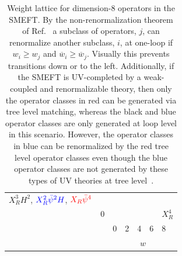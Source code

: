 \begin{table}[H]
\begin{center}
\begin{tabular}[t]{c c *5{| p{2.35cm}} }
$X_R^3 H^2$, ${\color{blue} X_R^2 \bar \psi^2 H}$, ${\color{red} X_R \bar \psi^4}$ \\ 
& 0 &      
           &                           
           &                         
           &                           
           & 
$X_R^4$ \\ 
& & 0 & 2 & 4 & 6 & 8 \\
 & 
\end{tabular}
\end{center}
\caption{Weight lattice for dimension-8 operators in the SMEFT. 
By the non-renormalization theorem of Ref.~\cite{Cheung:2015aba} a subclass of operators, $j$, can renormalize another subclass, $i$, at one-loop if $w_i \geq w_j$ and $\overline w_i \geq \overline w_j$. 
Visually this prevents transitions down or to the left.
Additionally, if the SMEFT is UV-completed by a weak-coupled and renormalizable theory, then only the operator classes in red can be generated via tree level matching, whereas the black and blue operator classes are only generated at loop level in this scenario.
However, the operator classes in blue can be renormalized by the red tree level operator classes even though the blue operator classes are not generated by these types of UV theories at tree level~\cite{Craig:2019wmo}.}
\label{tab:rge}
\end{table}









